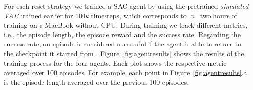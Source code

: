 For each reset strategy we trained a SAC agent by using the pretrained \textit{simulated VAE} trained earlier for 100\textit{k} timesteps, which corresponds to $\approx$ two hours of training on a MacBook without GPU. During training we track different metrics, i.e., the episode length, the episode reward and the success rate. Regarding the success rate, an episode is considered successful if the agent is able to return to the checkpoint it started from . Figure~\ref{fig:agentresults} shows the results of the training process for the four agents. Each plot shows the respective metric averaged over 100 episodes. For example, each point in Figure~\ref{fig:agentresults}.a is the episode length averaged over the previous 100 episodes. 



